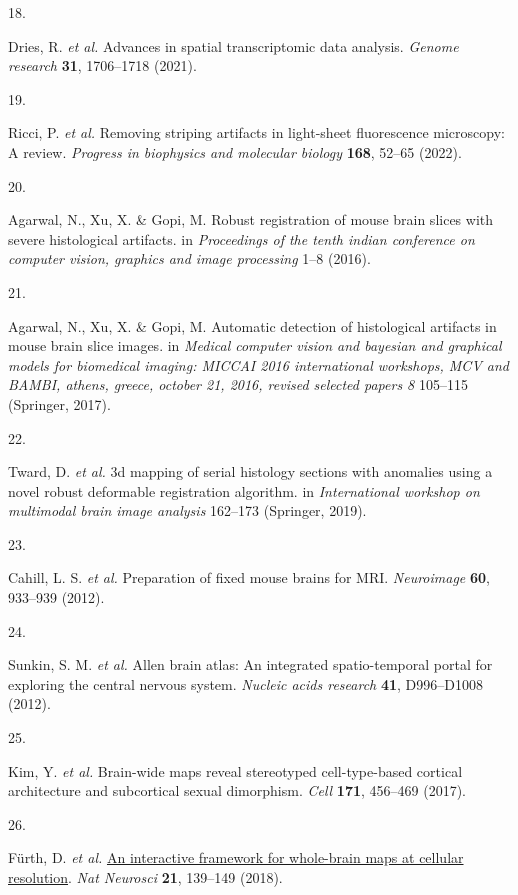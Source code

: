 \documentclass[
  12pt,
]{article}
\newlength{\cslhangindent}
\newlength{\csllabelwidth}
\newenvironment{CSLReferences}[2] %
 {\begin{list}{}{%
  \setlength{\itemindent}{0pt}
  \setlength{\leftmargin}{0pt}
  \setlength{\parsep}{0pt}
  \ifodd #1
   \setlength{\leftmargin}{\cslhangindent}
   \setlength{\itemindent}{-1\cslhangindent}
  \fi
  \setlength{\itemsep}{#2\baselineskip}}}
 {\end{list}}
\newcommand{\CSLLeftMargin}[1]{\parbox[t]{\csllabelwidth}{\strut#1\strut}}
\newcommand{\CSLRightInline}[1]{\parbox[t]{\linewidth - \csllabelwidth}{\strut#1\strut}}
\begin{document}
\begin{CSLReferences}{0}{0}
\CSLLeftMargin{18. }%
\CSLRightInline{Dries, R. \emph{et al.} Advances in spatial
transcriptomic data analysis. \emph{Genome research} \textbf{31},
1706--1718 (2021).}

\CSLLeftMargin{19. }%
\CSLRightInline{Ricci, P. \emph{et al.} Removing striping artifacts in
light-sheet fluorescence microscopy: A review. \emph{Progress in
biophysics and molecular biology} \textbf{168}, 52--65 (2022).}

\CSLLeftMargin{20. }%
\CSLRightInline{Agarwal, N., Xu, X. \& Gopi, M. Robust registration of
mouse brain slices with severe histological artifacts. in
\emph{Proceedings of the tenth indian conference on computer vision,
graphics and image processing} 1--8 (2016).}

\CSLLeftMargin{21. }%
\CSLRightInline{Agarwal, N., Xu, X. \& Gopi, M. Automatic detection of
histological artifacts in mouse brain slice images. in \emph{Medical
computer vision and bayesian and graphical models for biomedical
imaging: MICCAI 2016 international workshops, MCV and BAMBI, athens,
greece, october 21, 2016, revised selected papers 8} 105--115 (Springer,
2017).}

\CSLLeftMargin{22. }%
\CSLRightInline{Tward, D. \emph{et al.} 3d mapping of serial histology
sections with anomalies using a novel robust deformable registration
algorithm. in \emph{International workshop on multimodal brain image
analysis} 162--173 (Springer, 2019).}

\CSLLeftMargin{23. }%
\CSLRightInline{Cahill, L. S. \emph{et al.} Preparation of fixed mouse
brains for MRI. \emph{Neuroimage} \textbf{60}, 933--939 (2012).}

\CSLLeftMargin{24. }%
\CSLRightInline{Sunkin, S. M. \emph{et al.} Allen brain atlas: An
integrated spatio-temporal portal for exploring the central nervous
system. \emph{Nucleic acids research} \textbf{41}, D996--D1008 (2012).}

\CSLLeftMargin{25. }%
\CSLRightInline{Kim, Y. \emph{et al.} Brain-wide maps reveal stereotyped
cell-type-based cortical architecture and subcortical sexual dimorphism.
\emph{Cell} \textbf{171}, 456--469 (2017).}

\CSLLeftMargin{26. }%
\CSLRightInline{Fürth, D. \emph{et al.}
\href{https://doi.org/10.1038/s41593-017-0027-7}{An interactive
framework for whole-brain maps at cellular resolution}. \emph{Nat
Neurosci} \textbf{21}, 139--149 (2018).}


\end{CSLReferences}
\end{document}
